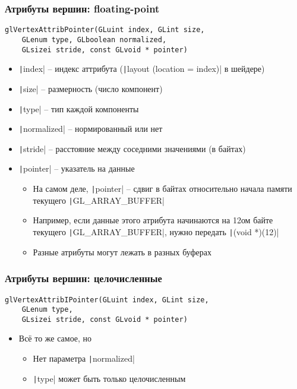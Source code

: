 \documentclass[10pt]{beamer}
\begin{document}
\begin{frame}[fragile]
\frametitle{Атрибуты вершин: floating-point}
\begin{verbatim}
glVertexAttribPointer(GLuint index, GLint size,
    GLenum type, GLboolean normalized,
    GLsizei stride, const GLvoid * pointer)
\end{verbatim}
\begin{itemize}
\item \texttt|index| -- индекс аттрибута (\texttt|layout (location = index)| в шейдере)
\pause
\item \texttt|size| -- размерность (число компонент)
\pause
\item \texttt|type| -- тип каждой компоненты
\pause
\item \texttt|normalized| -- нормированный или нет
\pause
\item \texttt|stride| -- расстояние между соседними значениями (в байтах)
\pause
\item \texttt|pointer| -- указатель на данные
\pause
\begin{itemize}
\item На самом деле, \texttt|pointer| -- сдвиг в байтах относительно начала памяти текущего \texttt|GL_ARRAY_BUFFER|
\item Например, если данные этого атрибута начинаются на 12ом байте текущего \texttt|GL_ARRAY_BUFFER|, нужно передать \texttt|(void *)(12)|
\pause
\item Разные атрибуты могут лежать в разных буферах
\end{itemize}
\end{itemize}
\end{frame}

\begin{frame}[fragile]
\frametitle{Атрибуты вершин: целочисленные}
\begin{verbatim}
glVertexAttribIPointer(GLuint index, GLint size,
    GLenum type,
    GLsizei stride, const GLvoid * pointer)
\end{verbatim}
\begin{itemize}
\item Всё то же самое, но 
\begin{itemize}
\item Нет параметра \texttt|normalized|
\item \texttt|type| может быть только целочисленным
\end{itemize}
\end{itemize}
\end{frame}
\end{document}
